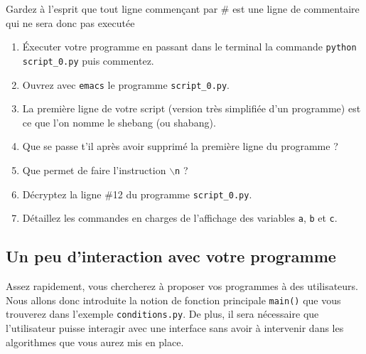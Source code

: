 Gardez à l'esprit que tout ligne commençant par \# est une ligne de commentaire qui ne
sera donc pas executée

\begin{enumerate}
\item Éxecuter votre programme en passant dans le terminal la commande \texttt{python script\_0.py} puis commentez.

\item Ouvrez avec \texttt{emacs} le programme \texttt{script\_0.py}.

\item La première ligne de votre script (version très simplifiée d'un programme)
  est ce que l'on nomme le shebang (ou shabang).

\item Que se passe t'il après avoir supprimé la première ligne du programme ?

\item Que permet de faire l'instruction  \texttt{$\backslash$n} ?

\item Décryptez la ligne \#12 du programme \texttt{script\_0.py}.

\item Détaillez les commandes en charges de l'affichage des variables \texttt{a}, \texttt{b} et \texttt{c}.


\end{enumerate}


\subsection{Un peu d'interaction avec votre programme}


Assez rapidement, vous chercherez à proposer vos programmes à des utilisateurs.
Nous allons donc introduite la notion de fonction principale \texttt{main()} que vous trouverez dans l'exemple
\texttt{conditions.py}.
De plus, il sera nécessaire que l'utilisateur puisse interagir avec une interface sans avoir à intervenir
dans les algorithmes que vous aurez mis en place.


